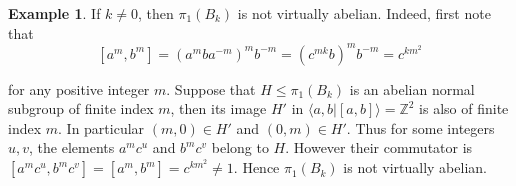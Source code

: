 \documentclass{amsart}
\theoremstyle{definition}
\newtheorem{example}[theorem]{Example}
\theoremstyle{remark}
\numberwithin{equation}{section}
\begin{document}
\begin{example}
{If $k\neq 0$, then $\pi_1(B_k)$ is not virtually abelian. Indeed, first note that \begin{equation}
\label{commutator}
  [a^m,b^m]=(a^mba^{-m})^mb^{-m}=(c^{mk}b)^mb^{-m}=c^{km^2}   
\end{equation}

for any positive integer $m$. Suppose that $H\leqslant \pi_1(B_k)$ is an abelian normal subgroup of finite index $m$, then its image $H'$ in $\langle a,b|[a,b] \rangle=\mathbb{Z}^2$ is also of finite index $m$. In particular $(m,0)\in H'$ and $(0,m)\in H'$. Thus for some integers $u,v$, the elements $a^mc^u$ and $b^mc^v$ belong to $H$. However their commutator is $[a^mc^u,b^mc^v]=[a^m,b^m]=c^{km^2}\neq 1$. Hence $\pi_1(B_k)$ is not virtually abelian.

}
\end{example}
\end{document}
